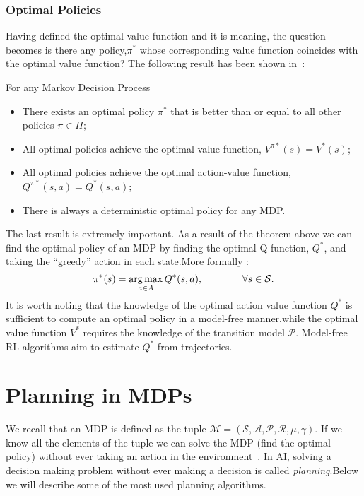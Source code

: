  \subsubsection{Optimal Policies}
 Having defined the optimal value function and it is meaning, the question becomes is there any policy,$\pi^*$ whose corresponding value function coincides with the optimal value function? The following result has been shown in~\cite{Sutton:1998:IRL:551283}:
\begin{theorem}
For any Markov Decision Process 
\begin{itemize}
\item There exists an optimal policy $\pi^*$ that is better than or equal to all other policies $\pi \in \Pi$; 
\item All optimal policies achieve the optimal value function, $V^{\pi*}(s)=V^*(s)$;
\item All optimal policies achieve the optimal action-value function, $Q^{\pi*}(s,a)=Q^*(s,a)$;
\item There is always a deterministic optimal policy for any MDP.
\end{itemize}
\end{theorem}
The last result is extremely important. As a result of the theorem above we can find the optimal policy of an MDP  by finding the optimal Q function, $Q^*$, and taking the  ``greedy'' action in each state.More formally :
\begin{equation}
			\pi^*(s)= \operatorname*{arg\,max}_{a\in A}Q^*(s,a),	\qquad \qquad \forall s \in \mathcal{S}.		
\end{equation}
It is worth noting that the knowledge of the optimal action value function $Q^*$ is sufficient to compute an optimal policy in a model-free manner,while the optimal value function $V^*$ requires the knowledge of the transition model $\mathcal{P}$. Model-free RL algorithms aim to estimate $Q^*$ from trajectories.
\section{Planning in MDPs} \label{planning_mdps}
We recall that an MDP is defined as the tuple $\mathcal{M}=(\mathcal{S,A,P,R},\mu,\gamma)$. If we know all the elements of the tuple we can solve the MDP (find the optimal policy) without ever taking an action in the environment~\cite{doi:10.2200/S00426ED1V01Y201206AIM017}. In AI, solving a decision making problem without ever making a decision is called \emph{planning}.Below we will describe some of the most used planning algorithms.
